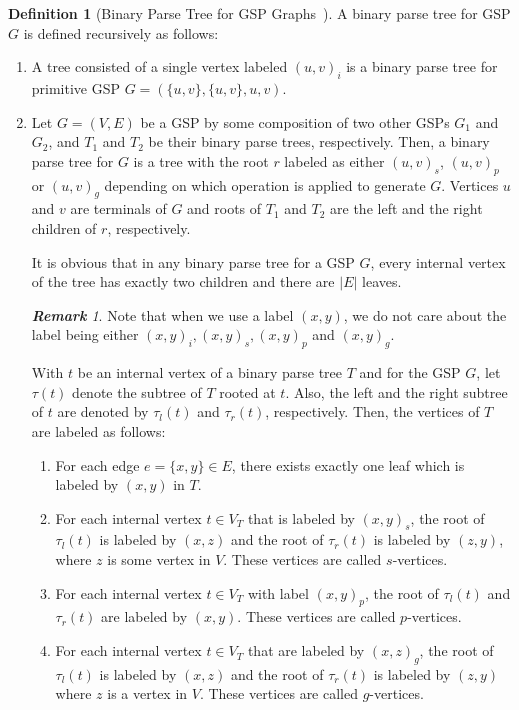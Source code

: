 \documentclass[12pt]{article}
\theoremstyle{definition}
\newtheorem{definition}[theorem]{Definition}
\theoremstyle{remark}
\newtheorem{remark}[theorem]{\bf Remark}
\begin{document}
\begin{definition}[Binary Parse Tree for GSP Graphs~\cite{kikuno1983linear}]
	A binary parse tree for GSP $G$  is defined recursively as follows:
	\begin{enumerate}
		\item
		A tree consisted of a single vertex labeled $(u,v)_i$ is a binary parse tree for primitive  GSP  $G=(\{u,v\},\{u,v\}, u,v)$.
		\item
		Let $G=(V,E)$ be a GSP by some composition of two other GSPs $G_1$ and $G_2$, and  $T_1$ and $T_2$ be their binary parse trees, respectively. Then, a binary parse tree for $G$ is a tree with the root $r$ labeled as either  $(u,v)_s$, $(u,v)_p$ or $(u,v)_g$ depending on which operation is applied to generate $G$. Vertices $u$ and $v$ are terminals of $G$ and roots of $T_1$ and $T_2$ are the left and the right children of $r$, respectively.
		
		It is obvious that in any binary parse tree for a GSP $G$, every internal vertex of the tree  has exactly two children and there are $\vert E \vert$  leaves.
		\begin{remark}
		Note that when we use a label $(x,y)$, we do not care about the label being either $(x,y)_i,(x,y)_s,(x,y)_p$ and $(x,y)_g$.
		\end{remark}
		
		With $t$ be an internal vertex of a binary parse tree $T$ and for the
GSP $G$, let $\tau(t)$ denote the subtree of $T$ rooted at $t$.  Also, the left and the right subtree of $t$  are denoted by  $\tau_l(t)$  and  $\tau_r(t)$,  respectively. Then, the vertices of $T$  are labeled as follows:
		
		\begin{enumerate}
			\item
			For each edge $e=\{x,y\} \in E$, there exists exactly one leaf which is labeled by $(x,y)$ in $T$.
			\item
			For each internal vertex $t \in V_T$  that is  labeled by $(x,y)_s$, the root of $\tau_l(t)$  is labeled by $(x,z)$ and the root of $\tau_r(t)$  is labeled by $(z,y)$, where $z$ is some vertex in $V$. These vertices are called $s$-vertices.
			\item
			For each internal vertex $t \in V_T$  with label $(x,y)_p$, the root of $\tau_l(t)$ and $\tau_r(t)$  are labeled by $(x,y)$. These vertices are called $p$-vertices.
			\item
			For each internal vertex $t \in V_T$ that are labeled by $(x,z)_g$, the root of $\tau_l(t)$  is labeled by $(x,z)$  and the root of $\tau_r(t)$ is labeled by $(z,y)$ where $z$ is a vertex in $V$. These vertices are called $g$-vertices.
		\end{enumerate}
	\end{enumerate}
	
\end{definition}
\end{document}
